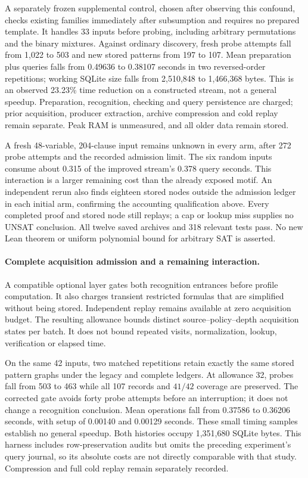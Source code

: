 \documentclass[11pt,a4paper]{article}
\numberwithin{equation}{section}
\theoremstyle{plain}
\theoremstyle{definition}
\theoremstyle{remark}
\begin{document}
A separately frozen supplemental control, chosen after observing this confound,
checks existing families immediately after subsumption and requires no prepared
template. It handles 33 inputs before probing, including arbitrary permutations
and the binary mixtures. Against ordinary discovery, fresh probe attempts fall
from 1,022 to 503 and new stored patterns from 197 to 107. Mean preparation plus
queries falls from 0.49636 to 0.38107 seconds in two reversed-order repetitions;
working SQLite size falls from 2,510,848 to 1,466,368 bytes. This is an observed
23.23\% time reduction on a constructed stream, not a general speedup. Preparation,
recognition, checking and query persistence are charged; prior acquisition,
producer extraction, archive compression and cold replay remain separate. Peak
RAM is unmeasured, and all older data remain stored.

A fresh 48-variable, 204-clause input remains unknown in every arm, after 272
probe attempts and the recorded admission limit. The six random inputs consume
about 0.315 of the improved stream's 0.378 query seconds. This interaction is a
larger remaining cost than the already exposed motif. An independent rerun also
finds eighteen stored nodes outside the admission ledger in each initial arm,
confirming the accounting qualification above. Every completed proof and stored
node still replays; a cap or lookup miss supplies no UNSAT conclusion. All twelve
saved archives and 318 relevant tests pass. No new Lean theorem or uniform
polynomial bound for arbitrary SAT is asserted.

\paragraph{Complete acquisition admission and a remaining interaction.}
A compatible optional layer gates both recognition entrances before profile
computation. It also charges transient restricted formulas that are simplified
without being stored. Independent replay remains available at zero acquisition
budget. The resulting allowance bounds distinct source--policy--depth acquisition
states per batch. It does not bound repeated visits, normalization, lookup,
verification or elapsed time.

On the same 42 inputs, two matched repetitions retain exactly the same stored
pattern graphs under the legacy and complete ledgers. At allowance 32, probes
fall from 503 to 463 while all 107 records and $41/42$ coverage are preserved.
The corrected gate avoids forty probe attempts before an interruption; it does
not change a recognition conclusion. Mean operations fall from 0.37586 to
0.36206 seconds, with setup of 0.00140 and 0.00129 seconds. These small timing
samples establish no general speedup. Both histories occupy 1,351,680 SQLite
bytes. This harness includes row-preservation audits but omits the preceding
experiment's query journal, so its absolute costs are not directly comparable
with that study. Compression and full cold replay remain separately recorded.
\end{document}
